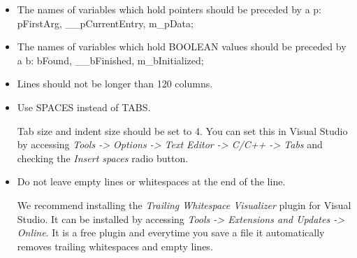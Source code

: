 \begin{appendices}
\begin{itemize}
	\item The names of variables which hold pointers should be preceded by a p: pFirstArg,
\_\_pCurrentEntry, m\_pData;
	\item The names of variables which hold BOOLEAN values should be preceded by a b: bFound,
\_\_bFinished, m\_bInitialized;

	\item Lines should not be longer than 120 columns.

	\item Use SPACES instead of TABS.

	Tab size and indent size should be set to 4. You can set this in Visual Studio by accessing \textit{Tools -> Options -> Text Editor -> C/C++ -> Tabs} and checking the \textit{Insert spaces} radio button.

	\item Do not leave empty lines or whitespaces at the end of the line.

	We recommend installing the \textit{Trailing Whitespace Visualizer} plugin for Visual Studio. It can be installed by accessing \textit{Tools -> Extensions and Updates -> Online}. It is a free plugin and everytime you save a file it automatically removes trailing whitespaces and empty lines.

\end{itemize}


\end{appendices}
